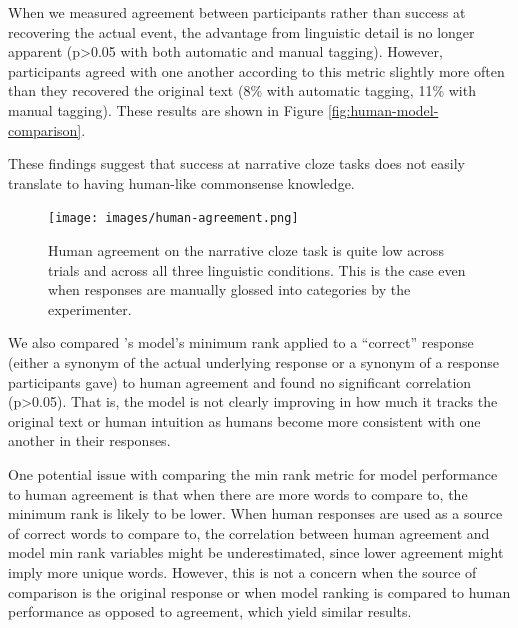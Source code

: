 \documentclass[10pt,a4paper]{article}
\begin{document}
When we measured agreement between participants rather than success at recovering the actual event, the advantage from linguistic detail is no longer apparent (p>0.05 with both automatic and manual tagging). However, participants agreed with one another according to this metric slightly more often than they recovered the original text (8\% with automatic tagging, 11\% with manual tagging). These results are shown in Figure \ref{fig:human-model-comparison}.


These findings suggest that success at narrative cloze tasks does not easily translate to having human-like commonsense knowledge.

\begin{figure}
 \centering
 \texttt{[image: images/human-agreement.png]}
 \caption{Human agreement on the narrative cloze task is quite low across trials and across all three linguistic conditions. This is the case even when responses are manually glossed into categories by the experimenter.}
 \label{fig:human-agreement}
\end{figure}

We also compared 's model's minimum rank applied to a ``correct'' response (either a synonym of the actual underlying response or a synonym of a response participants gave) to human agreement and found no significant correlation (p>0.05). That is, the model is not clearly improving in how much it tracks the original text or human intuition as humans become more consistent with one another in their responses.

One potential issue with comparing the min rank metric for model performance to human agreement is that when there are more words to compare to, the minimum rank is likely to be lower. When human responses are used as a source of correct words to compare to, the correlation between human agreement and model min rank variables might be underestimated, since lower agreement might imply more unique words. However, this is not a concern when the source of comparison is the original response or when model ranking is compared to human performance as opposed to agreement, which yield similar results.
\end{document}
